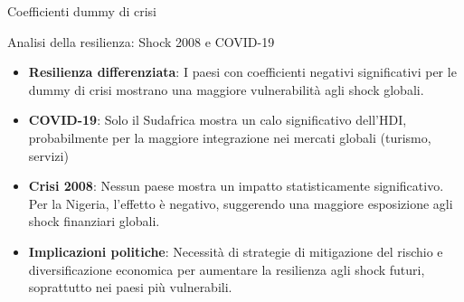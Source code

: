 \documentclass[
  ignorenonframetext,
  aspectratio=43,
]{beamer}
\begin{document}
\begin{frame}{Coefficienti dummy di crisi}
\label{coefficienti-dummy-di-crisi}
\end{frame}

\begin{frame}{Analisi della resilienza: Shock 2008 e COVID-19}
\label{analisi-della-resilienza-shock-2008-e-covid-19}
\begin{itemize}
  \item \textbf{Resilienza differenziata}: I paesi con coefficienti negativi significativi per le dummy di crisi mostrano una maggiore vulnerabilità agli shock globali.
  \item \textbf{COVID-19}: Solo il Sudafrica mostra un calo significativo dell'HDI, probabilmente per la maggiore integrazione nei mercati globali (turismo, servizi)
  \item \textbf{Crisi 2008}: Nessun paese mostra un impatto statisticamente significativo. Per la Nigeria, l'effetto è negativo, suggerendo una maggiore esposizione agli shock finanziari globali.
  \item \textbf{Implicazioni politiche}: Necessità di strategie di mitigazione del rischio e diversificazione economica per aumentare la resilienza agli shock futuri, soprattutto nei paesi più vulnerabili.
\end{itemize}
\end{frame}
\end{document}
